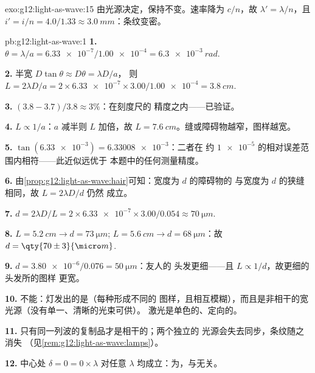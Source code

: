 \begin{solution}{exo:g12:light-as-wave:15}
由光源决定，保持不变。速率降为
$c/n$，故 $\lambda' = \lambda/n$，且
$i' = i/n = 4.0/1.33 \approx \qty{3.0}{mm}$：条纹变密。
\end{solution}

\begin{solution}{pb:g12:light-as-wave:1}
\textbf{1.} $\theta = \lambda/a = \num{6.33e-7}/\num{1.00e-4} =
\qty{6.3e-3}{rad}$.

\textbf{2.} 半宽 $D\tan\theta \approx D\theta = \lambda D/a$，
则 $L = 2\lambda D/a = 2 \times \num{6.33e-7} \times
3.00/\num{1.00e-4} = \qty{3.8}{cm}$.

\textbf{3.} $(3.8 - 3.7)/3.8 \approx 3\%$：在刻度尺的
精度之内——已验证。

\textbf{4.} $L \propto 1/a$：$a$ 减半则 $L$ 加倍，故
$L = \qty{7.6}{cm}$。缝或障碍物越窄，图样越宽。

\textbf{5.} $\tan(\num{6.33e-3}) = \num{6.33008e-3}$：二者在
约 $\num{1e-5}$ 的相对误差范围内相符——此近似远优于
本题中的任何测量精度。

\textbf{6.} 由\cref{prop:g12:light-as-wave:hair}可知：宽度为 $d$ 的障碍物的
与宽度为 $d$ 的狭缝相同，故 $L = 2\lambda D/d$ 仍然
成立。

\textbf{7.} $d = 2\lambda D/L = 2 \times \num{6.33e-7} \times
3.00/0.054 \approx \qty{70}{\micro m}$.

\textbf{8.} $L = \qty{5.2}{cm} \to d = \qty{73}{\micro m}$;
$L = \qty{5.6}{cm} \to d = \qty{68}{\micro m}$：故
$d = \qty{70 \pm 3}{\micro m}$.

\textbf{9.} $d = \num{3.80e-6}/0.076 = \qty{50}{\micro m}$：友人的
头发更细——且 $L \propto 1/d$，故更细的头发所的图样
更宽。

\textbf{10.} 不能：灯发出的是（每种形成不同的
图样，且相互模糊），而且是非相干的宽光源（没有单一、清晰的光束可供）。
激光是单色的、定向的。

\textbf{11.} 只有同一列波的复制品才是相干的；两个独立的
光源会失去同步，条纹随之消失
（见\cref{rem:g12:light-as-wave:lamps}）。

\textbf{12.} 中心处 $\delta = 0 = 0 \times \lambda$ 对任意
$\lambda$ 均成立：为，与无关。


\end{solution}

